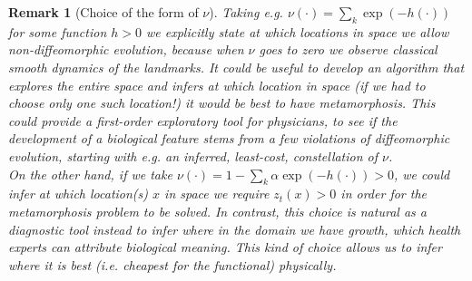 \documentclass{article}
\newtheorem{remark}{Remark}
\begin{document}
\begin{remark}[Choice of the form of $\nu$]
Taking e.g. $\nu(\cdot) = \sum_k \exp(-h(\cdot))$ for some function $h>0$ we
explicitly state at which locations in space we allow non-diffeomorphic
evolution, because when $\nu$ goes to zero we observe classical smooth dynamics
of the landmarks.  It could be useful to develop an algorithm that explores the
entire space and infers at which location in space (if we had to choose only one
such location!) it would be best to have metamorphosis. This could provide a
first-order exploratory tool for physicians, to see if the development of a
biological feature stems from a few violations of diffeomorphic evolution,
starting with e.g. an inferred, least-cost, constellation of $\nu$.\\

On the other hand, if we take $\nu(\cdot) = 1 - \sum_k \alpha
\exp(-h(\cdot))>0$, we could infer at which location(s) $x$ in space we require
$z_t(x)>0$ in order for the metamorphosis problem to be solved. In contrast,
this choice is natural as a diagnostic tool instead to infer where in the domain
we have growth, which health experts can attribute biological meaning. This kind
of choice allows us to infer where it is best (i.e. cheapest for the functional)
\emph{physically}.
\end{remark}
\end{document}
